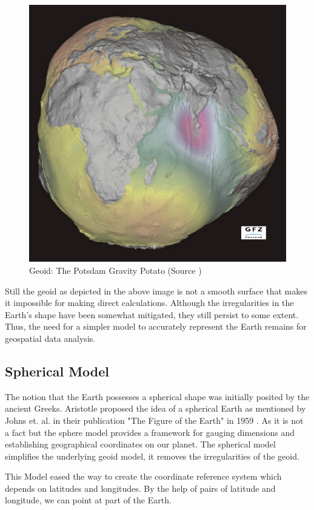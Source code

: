 \begin{figure}[h]
    \centering
    \includegraphics[width=0.7\linewidth]{figures/chapter-2/geoid.jpg}
    \caption{Geoid: The Potsdam Gravity Potato (Source \cite{GEOID_IMAGE}) }
    \label{fig:geoid-image}
\end{figure}

Still the geoid as depicted in the above image is not a smooth surface that makes it impossible for making direct calculations. Although the irregularities in the Earth's shape have been somewhat mitigated, they still persist to some extent. Thus, the need for a simpler model to accurately represent the Earth remains for geospatial data analysis.


\subsection{Spherical Model}

The notion that the Earth possesses a spherical shape was initially posited by the ancient Greeks. Aristotle proposed the idea of a spherical Earth as
mentioned by Johns et. al. in their publication "The Figure of the Earth" in 1959 \cite{Johns1959-og}.
As it is not a fact but the sphere model provides a framework for gauging dimensions and establishing geographical coordinates on our planet. The spherical model simplifies the underlying geoid model,
it removes the irregularities of the geoid.

This Model eased the way to create the coordinate reference system which depends on latitudes and longitudes. By the help of pairs of latitude and longitude, we can point at part of the Earth.

